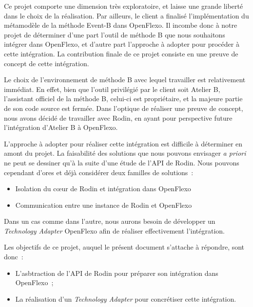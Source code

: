 Ce projet comporte une dimension très exploratoire, et laisse une grande liberté dans le choix de la réalisation.
Par ailleurs, le client a finalisé l'implémentation du métamodèle de la méthode Event-B dans OpenFlexo.
Il incombe donc à notre projet de déterminer d'une part l'outil de méthode B que nous souhaitons intégrer dans OpenFlexo, et d'autre part l'approche à adopter pour procéder à cette intégration.
La contribution finale de ce projet consiste en une preuve de concept de cette intégration.

Le choix de l'environnement de méthode B avec lequel travailler est relativement immédiat.
En effet, bien que l'outil privilégié par le client soit Atelier B, l'assistant officiel de la méthode B, celui-ci est propriétaire, et la majeure partie de son code source est fermée.
Dans l'optique de réaliser une preuve de concept, nous avons décidé de travailler avec Rodin, en ayant pour perspective future l'intégration d'Atelier B à OpenFlexo.

L'approche à adopter pour réaliser cette intégration est difficile à déterminer en amont du projet.
La faisabilité des solutions que nous pouvons envisager \textit{a priori} ne peut se dessiner qu'à la suite d'une étude de l'API de Rodin.
Nous pouvons cependant d'ores et déjà considérer deux familles de solutions~:

\begin{itemize}
    \item Isolation du cœur de Rodin et intégration dans OpenFlexo
    \item Communication entre une instance de Rodin et OpenFlexo
\end{itemize}

Dans un cas comme dans l'autre, nous aurons besoin de développer un \textit{Technology Adapter} OpenFlexo afin de réaliser effectivement l'intégration.
\newline

Les objectifs de ce projet, auquel le présent document s'attache à répondre, sont donc~:

\begin{itemize}
    \item L'asbtraction de l'API de Rodin pour préparer son intégration dans OpenFlexo~;
    \item La réalisation d'un \textit{Technology Adapter} pour concrétiser cette intégration.
\end{itemize}
